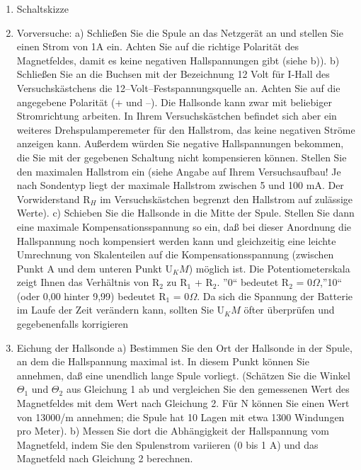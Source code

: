 \documentclass[12pt]{scrartcl}
\begin{document}
\begin{enumerate}
\item Schaltskizze \newline
\item Vorversuche: \newline
a) Schließen Sie die Spule an das Netzgerät an und stellen Sie einen Strom von 1A ein. Achten Sie auf die richtige Polarität des Magnetfeldes, damit es keine negativen Hallspannungen gibt (siehe b)).
b) Schließen Sie an die Buchsen mit der Bezeichnung 12 Volt für I-Hall des Versuchskästchens die 12–Volt–Festspannungsquelle an. Achten Sie auf die angegebene Polarität (+ und –). Die Hallsonde kann zwar mit beliebiger Stromrichtung arbeiten. In Ihrem Versuchskästchen befindet sich aber ein weiteres Drehspulamperemeter für den Hallstrom, das keine negativen Ströme anzeigen kann. Außerdem würden Sie negative Hallspannungen bekommen, die
Sie mit der gegebenen Schaltung nicht kompensieren können. Stellen Sie den
maximalen Hallstrom ein (siehe Angabe auf Ihrem Versuchsaufbau! Je nach
Sondentyp liegt der maximale Hallstrom zwischen 5 und 100 mA. Der Vorwiderstand
R$_H$ im Versuchskästchen begrenzt den Hallstrom auf zulässige Werte).
c) Schieben Sie die Hallsonde in die Mitte der Spule. Stellen Sie dann eine maximale Kompensationsspannung so ein, daß bei dieser Anordnung die Hallspannung noch kompensiert werden kann und gleichzeitig eine leichte Umrechnung von Skalenteilen auf die Kompensationsspannung (zwischen Punkt A und dem unteren Punkt U$_KM$) möglich ist. Die Potentiometerskala zeigt Ihnen das Verhältnis von R$_2$ zu R$_1$ + R$_2$.
”0“ bedeutet R$_2$ = 0$\Omega$,”10“ (oder
0,00 hinter 9,99) bedeutet R$_1$ = 0$\Omega$. Da sich die Spannung der Batterie im Laufe der Zeit verändern kann, sollten Sie U$_KM$ öfter überprüfen und gegebenenfalls korrigieren
\item Eichung der Hallsonde \newline
a) Bestimmen Sie den Ort der Hallsonde in der Spule, an dem die Hallspannung
maximal ist. In diesem Punkt können Sie annehmen, daß eine unendlich lange
Spule vorliegt. (Schätzen Sie die Winkel
$\Theta_1$ und $\Theta_2$ aus Gleichung 1 ab und vergleichen Sie den gemessenen Wert des Magnetfeldes mit dem Wert nach Gleichung 2. Für N können Sie einen Wert von 13000/m annehmen; die Spule hat 10 Lagen mit etwa 1300 Windungen pro Meter).
b) Messen Sie dort die Abhängigkeit der Hallspannung vom Magnetfeld, indem
Sie den Spulenstrom variieren (0 bis 1 A) und das Magnetfeld nach Gleichung
2 berechnen.

\end{enumerate}
\end{document}
